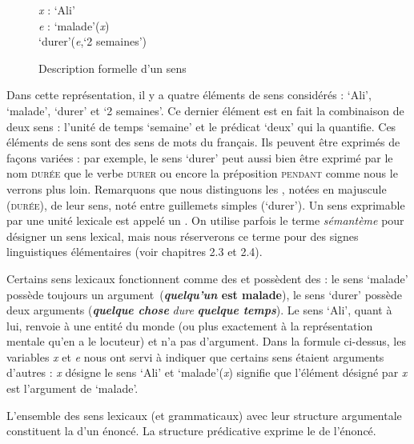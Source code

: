 \begin{figure}
     \caption{Description formelle d’un sens}
    \label{fig:sens-maladie}
\begin{center}
\textit{x} : ‘Ali’\\
\textit{e} : ‘malade’(\textit{x})\\
‘durer’(\textit{e},‘2 semaines’)
\end{center}
\end{figure}

Dans cette représentation, il y a quatre éléments de sens considérés : ‘Ali’, ‘malade’, ‘durer’ et ‘2 semaines’. Ce dernier élément est en fait la combinaison de deux sens : l’unité de temps ‘semaine’ et le prédicat ‘deux’ qui la quantifie. Ces éléments de sens sont des sens de mots du français. Ils peuvent être exprimés de façons variées : par exemple, le sens ‘durer’ peut aussi bien être exprimé par le nom \textsc{durée} que le verbe \textsc{durer} ou encore la préposition \textsc{pendant} comme nous le verrons plus loin. Remarquons que nous distinguons les , notées en majuscule (\textsc{durée}), de leur sens, noté entre guillemets simples (‘durer’). Un sens exprimable par une unité lexicale est appelé un . On utilise parfois le terme \textit{sémantème} pour désigner un sens lexical, mais nous réserverons ce terme pour des signes linguistiques élémentaires (voir chapitres 2.3 et 2.4).

Certains sens lexicaux fonctionnent comme des  et possèdent des  : le sens ‘malade’ possède toujours un argument~(\textbf{\textit{quelqu’un} est malade}), le sens ‘durer’ possède deux arguments (\textbf{\textit{quelque chose}} \textit{dure} \textbf{\textit{quelque temps}}). Le sens ‘Ali’, quant à lui, renvoie à une entité du monde (ou plus exactement à la représentation mentale qu’en a le locuteur) et n’a pas d’argument. Dans la formule ci-dessus, les variables \textit{x} et \textit{e} nous ont servi à indiquer que certains sens étaient arguments d’autres : \textit{x} désigne le sens ‘Ali’ et ‘malade’(\textit{x}) signifie que l’élément désigné par \textit{x} est l’argument de ‘malade’.

{L'ensemble des sens lexicaux (et grammaticaux) avec leur structure argumentale constituent la  d'un énoncé. La structure prédicative exprime le  de l’énoncé.}

